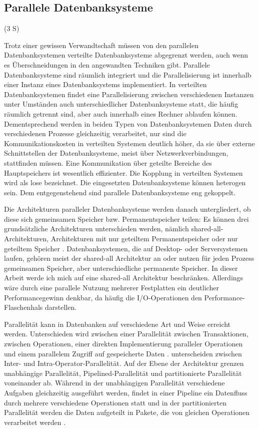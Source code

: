 \documentclass[a4paper,12pt,twoside]{article}
\begin{document}
\subsection{Parallele Datenbanksysteme} (3 S)
\label{P_DBS} 

Trotz einer gewissen Verwandtschaft müssen von den parallelen Datenbanksystemen verteilte Datenbanksysteme abgegrenzt werden, auch wenn es Überschneidungen in den angewandten Techniken gibt. Parallele Datenbanksysteme sind räumlich integriert und die Parallelisierung ist innerhalb einer Instanz eines Datenbanksystems implementiert. In verteilten Datenbanksystemen findet eine Parallelisierung zwischen verschiedenen Instanzen unter Umständen auch unterschiedlicher Datenbanksysteme statt, die häufig räumlich getrennt sind, aber auch innerhalb eines Rechner ablaufen können. Dementsprechend werden in beiden Typen von Datenbanksystemen Daten durch verschiedenen Prozesse gleichzeitig verarbeitet, nur sind die Kommunikationskosten in verteilten Systemen deutlich höher, da sie über externe Schnittstellen der Datenbanksysteme, meist über Netzwerkverbindungen, stattfinden müssen. Eine Kommunikation über geteilte Bereiche des Hauptspeichers ist wesentlich effizienter. Die Kopplung in verteilten Systemen wird als lose bezeichnet. Die eingesetzten Datenbanksysteme können heterogen sein. Dem entgegenstehend sind parallele Datenbanksysteme eng gekoppelt.

Die Architekturen paralleler Datenbanksysteme werden danach untergliedert, ob diese sich gemeinsamen Speicher bzw. Permanentspeicher teilen: Es können drei grundsätzliche Architekturen unterschieden werden, nämlich shared-all-Architekturen, Architekturen mit nur geteiltem Permanentspeicher oder nur geteiltem Speicher \parencite{Yu1998}. Datenbanksystemen, die auf Desktop- oder Serversystemen laufen, gehören meist der shared-all Architektur an oder nutzen für jeden Prozess gemeinsamen Speicher, aber unterschiedliche permanente Speicher. In dieser Arbeit werde ich mich auf eine shared-all Architektur beschränken. Allerdings wäre durch eine parallele Nutzung mehrerer Festplatten ein deutlicher Performancegewinn denkbar, da häufig die I/O-Operationen den Performance-Flaschenhals darstellen.

Parallelität kann in Datenbanken auf verschiedene Art und Weise erreicht werden. Unterschieden wird zwischen einer Parallelität zwischen Transaktionen, zwischen Operationen, einer direkten Implementierung paralleler Operationen und einem parallelem Zugriff auf gespeicherte Daten \parencite{Reuter1999}. \textcite [S. 1]{Yu1998} unterscheiden zwischen Inter- und Intra-Operator-Parallelität. Auf der Ebene der Architektur grenzen \textcite{Yu1998} unabhängige Parallelität, Pipelined-Parallelität und partitionierte Parallelität voneinander ab. Während in der unabhängigen Parallelität verschiedene Aufgaben gleichzeitig ausgeführt werden, findet in einer Pipeline ein Datenfluss durch mehrere verschiedene Operationen statt und in der partitionierten Parallelität werden die Daten aufgeteilt in Pakete, die von gleichen Operationen verarbeitet werden \parencite{DeWitt1992}.
\end{document}
